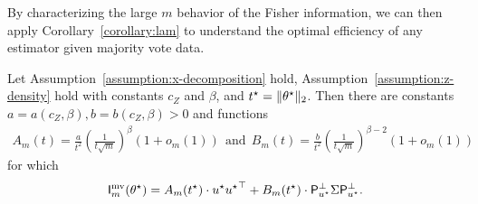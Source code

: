\noindent
By characterizing the large $m$ behavior of the Fisher information,
we can then apply Corollary~\ref{corollary:lam} to understand
the optimal efficiency of any estimator given majority vote
data. 

\begin{theorem}
  \label{thm:lower-bound-fisher-information}
  Let Assumption~\ref{assumption:x-decomposition} hold,
  Assumption~\ref{assumption:z-density} hold with
  constants $c_Z$ and $\beta$,
  and $t^\star = \|{\theta^\star}\|_2$.
  Then there are constants $a = a(c_Z, \beta), b = b(c_Z, \beta) > 0$ and 
  functions
  \begin{align*}
    A_m(t) = \frac{a}{t^2} \left(\frac{1}{t\sqrt{m}}\right)^{\beta}( 1 + o_m(1))
    ~~ \mbox{and} ~~
    B_m(t) = \frac{b}{t^2}\left(\frac{1}{t\sqrt{m}}\right)^{\beta-2} (1 + o_m(1))
  \end{align*}
  for which
  \begin{equation*}
    \mathsf{I}^{\textup{mv}}_m(\theta^\star) = A_m (t^\star) \cdot u^\star {u^\star}^\top + B_m(t^\star) \cdot \mathsf{P}_{u^\star}^\perp \Sigma \mathsf{P}_{u^\star}^\perp.
  \end{equation*}
\end{theorem}
\noindent

